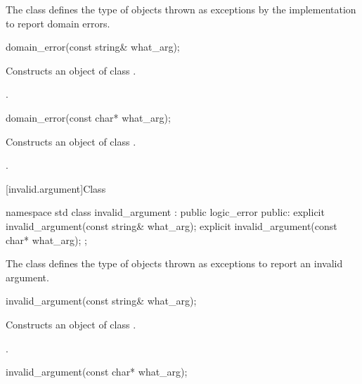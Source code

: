 \pnum
The class
defines the type of objects thrown as
exceptions by the implementation to report domain errors.

%
\begin{itemdecl}
domain_error(const string& what_arg);
\end{itemdecl}

\begin{itemdescr}
\pnum
\effects
Constructs an object of class
.

\pnum
\postconditions
{}.
\end{itemdescr}

%
\begin{itemdecl}
domain_error(const char* what_arg);
\end{itemdecl}

\begin{itemdescr}
\pnum
\effects
Constructs an object of class
.

\pnum
\postconditions
{}.
\end{itemdescr}

[invalid.argument]{Class }

%
\begin{codeblock}
namespace std {
  class invalid_argument : public logic_error {
  public:
    explicit invalid_argument(const string& what_arg);
    explicit invalid_argument(const char* what_arg);
  };
}
\end{codeblock}

\pnum
The class
defines the type of objects thrown as exceptions to report an invalid argument.

%
\begin{itemdecl}
invalid_argument(const string& what_arg);
\end{itemdecl}

\begin{itemdescr}
\pnum
\effects
Constructs an object of class
.

\pnum
\postconditions
{}.
\end{itemdescr}

%
\begin{itemdecl}
invalid_argument(const char* what_arg);
\end{itemdecl}

